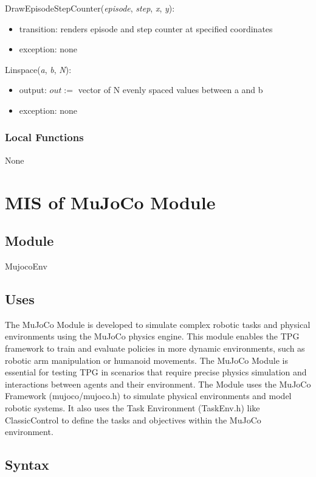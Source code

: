 \documentclass[12pt, titlepage]{article}
\begin{document}
\noindent DrawEpisodeStepCounter(\textit{episode}, \textit{step}, \textit{x}, \textit{y}):
\begin{itemize}
\item transition: renders episode and step counter at specified coordinates
\item exception: none
\end{itemize}

\noindent Linspace(\textit{a}, \textit{b}, \textit{N}):
\begin{itemize}
\item output: $out := $ vector of N evenly spaced values between a and b
\item exception: none
\end{itemize}

\subsubsection{Local Functions}
None

\newpage

\section{MIS of MuJoCo Module} \label{MuJoCo Module}

\subsection{Module}
MujocoEnv

\subsection{Uses}
The MuJoCo Module is developed to simulate complex robotic tasks and physical environments using the MuJoCo physics engine. This module enables the TPG framework to train and evaluate policies in more dynamic environments, such as robotic arm manipulation or humanoid movements. The MuJoCo Module is essential for testing TPG in scenarios that require precise physics simulation and interactions between agents and their environment. The Module uses the MuJoCo Framework (mujoco/mujoco.h) to simulate physical environments and model robotic systems.  It also uses the Task Environment (TaskEnv.h) like ClassicControl to define the tasks and objectives within the MuJoCo environment.

\subsection{Syntax}
\end{document}
